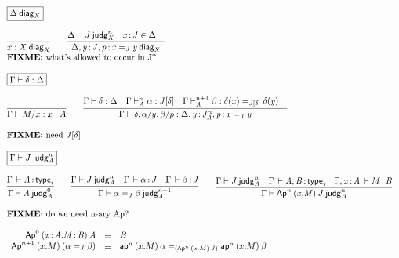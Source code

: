 \begin{small}
\[
\begin{array}{l}

\framebox{\wfdiag{\Delta}{X}} \\ \\

\infer{\wfdiag{x:X}{X}}{} 
\qquad
\infer{\wfdiag{\Delta,\tptm{y}{J},\tptm{p}{\homj{J}{x}{y}}}{X}}
      {\wfjudg{\Delta}{J}{n}{X} &
       \tptm{x}{J} \in \Delta &
      } \\
\text{\FIXME{what's allowed to occur in J?}}
\\ \\

\framebox{\wfdsubst{\Gamma}{\delta}{\Delta}} \\ \\

\infer{\wfdsubst{\Gamma}{M/x}{x:A}}{} 
\qquad
\infer{\wfdsubst{\Gamma}{\delta,\alpha/y,\beta/p}{\Delta,\tptm{y}{J^n_A},\tptm{p}{\homj{J}{x}{y}}}}
      {\wfdsubst{\Gamma}{\delta}{\Delta} &
       \ofjudg{\Gamma}{n}{A}{\alpha}{\tsubst{J}{\delta}} &
       \ofjudg{\Gamma}{n+1}{A}{\beta}{\homj{\tsubst{J}{\delta}}{\delta(x)}{\delta(y)}} &
      } \\ \\

\text{\FIXME{need \tsubst{J}{\delta}}}

\\ \\

\framebox{\wfjudg{\Gamma}{J}{n}{A}} \\ \\

\infer{\wfjudg{\Gamma}{A}{0}{A}}{\oftp{\Gamma}{A}{\typ{i}}}
\qquad
\infer{\wfjudg{\Gamma}{\homj{J}{\alpha}{\beta}}{n+1}{A}}
      {\wfjudg{\Gamma}{J}{n}{A} &
        \oftp{\Gamma}{\alpha}{J} &
        \oftp{\Gamma}{\beta}{J}
      }
\qquad
\infer{\wfjudg{\Gamma}{\Apn{n}{(x.M)}{J}}{n}{B}}
      {\wfjudg{\Gamma}{J}{n}{A} &
       \oftp{\Gamma}{A,B}{\typ{i}} & 
       \oftp{\Gamma,\tptm{x}{A}}{M}{B}}
\\ \\
\text{\FIXME{do we need n-ary Ap?}}
\\ \\

\begin{array}{rcl}
\Apn{0}{(\tptm{x}{A}.\tptm{M}{B})}{A} & \equiv & {B} \\
\Apn{n+1}{(x.M)}{(\homj{J}{\alpha}{\beta})} & \equiv & \homj{(\Apn{n}{(x.M)}{J})}{\apn{n}{(x.M)}{\alpha}}{\apn{n}{(x.M)}{\beta}} \\
\end{array}


\end{array}\]
\end{small}
